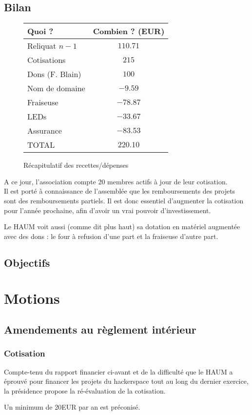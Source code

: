 \documentclass[11pt]{article}
\begin{document}
\subsection{Bilan}

\begin{figure}[h]
\centering
\begin{tabular}{l|c}
Quoi ? & Combien ? (EUR)  \\\hline
Reliquat $n-1$ & $110.71$\\
Cotisations & $215$ \\
Dons (F. Blain) & $100$ \\
Nom de domaine & $-9.59$\\
Fraiseuse & $-78.87$\\
LEDs & $-33.67$\\
Assurance & $-83.53$\\\hline\hline
TOTAL & $220.10$\\
\end{tabular}
\caption{Récapitulatif des recettes/dépenses}
\end{figure}

A ce jour, l'association compte 20 membres actifs à jour de leur cotisation. \\

Il est porté à connaissance de l'assemblée que les remboursements des projets sont des remboursements partiels. Il est donc essentiel d'augmenter la cotisation pour l'année prochaine, afin d'avoir un vrai pouvoir d'investissement.

Le HAUM voit aussi (comme dit plus haut) sa dotation en matériel augmentée avec des dons : le four à refusion d'une part et la fraiseuse d'autre part.

\subsection{Objectifs}


\section{Motions}

\subsection{Amendements au règlement intérieur}

\subsubsection{Cotisation}

Compte-tenu du rapport financier ci-avant et de la difficulté que le HAUM a éprouvé pour financer les projets du hackerspace tout au long du dernier exercice, la présidence propose la ré-évaluation de la cotisation.

Un minimum de 20EUR par an est préconisé.
\end{document}
